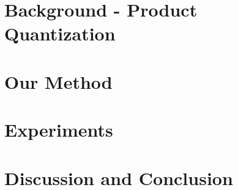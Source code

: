 \documentclass{article}  %
\newcommand{\ours}{\textsc{Maddness}}
\begin{document}
\section{Background - Product Quantization} \label{sec:background}
\vspace{-.5mm}



\vspace{-3mm}
\section{Our Method} \label{sec:method}
\vspace{-.5mm}



\section{Experiments} \label{sec:results}



\section{Discussion and Conclusion}
\vspace{-.5mm}

\end{document}

